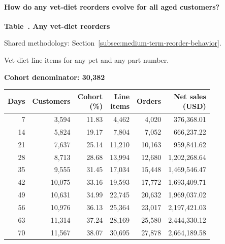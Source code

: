 \paragraph{How do any vet-diet reorders evolve for all aged customers?}

\label{tab:financial-opportunity-reorder-any-vet-diet}
\par\smallskip\noindent\parbox[t][2\baselineskip][t]{\linewidth}{\raggedright\textbf{Table~\thetable. Any vet-diet reorders}}
\par\raggedright\footnotesize Shared methodology: Section~\ref{subsec:medium-term-reorder-behavior}.
\par\noindent\parbox[t][2\baselineskip][t]{\linewidth}{\raggedright Vet-diet line items for any pet and any part number.}
\par\noindent\textbf{Cohort denominator: 30,382}
\par\centering\footnotesize
\setlength{\tabcolsep}{2pt}
\begin{tabular}{rrrrrr}\toprule
Days & Customers & \shortstack{Cohort\\(\%)} & \shortstack{Line\\items} & Orders & \shortstack{Net sales\\(USD)} \\ \midrule

7 & 3,594 & 11.83 & 4,462 & 4,020 & 376,368.01 \\

14 & 5,824 & 19.17 & 7,804 & 7,052 & 666,237.22 \\

21 & 7,637 & 25.14 & 11,210 & 10,163 & 959,841.62 \\

28 & 8,713 & 28.68 & 13,994 & 12,680 & 1,202,268.64 \\

35 & 9,555 & 31.45 & 17,034 & 15,448 & 1,469,546.47 \\

42 & 10,075 & 33.16 & 19,593 & 17,772 & 1,693,409.71 \\

49 & 10,631 & 34.99 & 22,745 & 20,632 & 1,969,037.02 \\

56 & 10,976 & 36.13 & 25,364 & 23,017 & 2,197,421.03 \\

63 & 11,314 & 37.24 & 28,169 & 25,580 & 2,444,330.12 \\

70 & 11,567 & 38.07 & 30,695 & 27,878 & 2,664,189.58 \\
\bottomrule\end{tabular}\par

